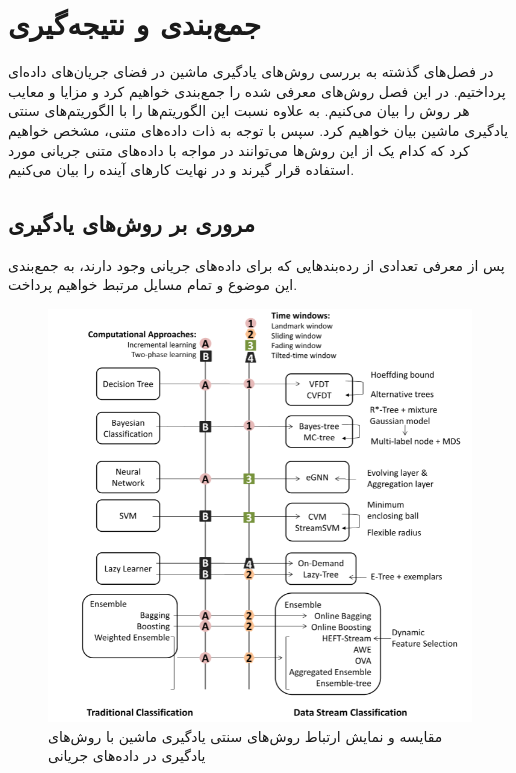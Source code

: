 \chapter{جمع‌بندی و نتیجه‌گیری}
\thispagestyle{empty}

در فصل‌های گذشته به بررسی روش‌های یادگیری ماشین در فضای جریان‌های داده‌ای پرداختیم. در این فصل روش‌های معرفی شده را جمع‌بندی خواهیم کرد و مزایا و معایب هر روش را بیان می‌کنیم. به علاوه نسبت این الگوریتم‌ها را با الگوریتم‌های سنتی یادگیری ماشین بیان‌ خواهیم کرد. سپس با توجه به ذات داده‌های متنی، مشخص‌ خواهیم کرد که کدام یک از این روش‌ها می‌توانند در مواجه با داده‌های متنی جریانی مورد استفاده قرار گیرند و در نهایت کارهای آینده را بیان می‌کنیم.

\section{مروری بر روش‌های یادگیری}\label{sec4}
پس از معرفی تعدادی از رده‌بندهایی که برای داده‌های جریانی وجود دارند، به جمع‌بندی این موضوع و تمام مسایل مرتبط خواهیم پرداخت.

\begin{figure}%
\centerline{\includegraphics[width=15cm]{compare}}
\caption{مقایسه و نمایش ارتباط روش‌های سنتی یادگیری ماشین با رو‌ش‌های یادگیری در داده‌های جریانی}
\label{fig:compare}
\end{figure}

